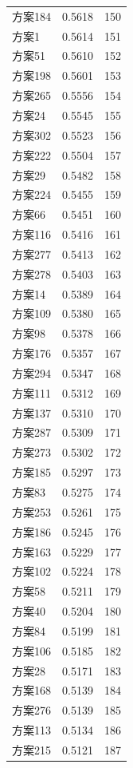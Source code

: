 \documentclass[12pt,a4paper]{article}
\begin{document}
\begin{table}[H]
\begin{tabular}{lcc}
    方案184 & 0.5618 & 150 \\
    方案1 & 0.5614 & 151 \\
    方案51 & 0.5610 & 152 \\
    方案198 & 0.5601 & 153 \\
    方案265 & 0.5556 & 154 \\
    方案24 & 0.5545 & 155 \\
    方案302 & 0.5523 & 156 \\
    方案222 & 0.5504 & 157 \\
    方案29 & 0.5482 & 158 \\
    方案224 & 0.5455 & 159 \\
    方案66 & 0.5451 & 160 \\
    方案116 & 0.5416 & 161 \\
    方案277 & 0.5413 & 162 \\
    方案278 & 0.5403 & 163 \\
    方案14 & 0.5389 & 164 \\
    方案109 & 0.5380 & 165 \\
    方案98 & 0.5378 & 166 \\
    方案176 & 0.5357 & 167 \\
    方案294 & 0.5347 & 168 \\
    方案111 & 0.5312 & 169 \\
    方案137 & 0.5310 & 170 \\
    方案287 & 0.5309 & 171 \\
    方案273 & 0.5302 & 172 \\
    方案185 & 0.5297 & 173 \\
    方案83 & 0.5275 & 174 \\
    方案253 & 0.5261 & 175 \\
    方案186 & 0.5245 & 176 \\
    方案163 & 0.5229 & 177 \\
    方案102 & 0.5224 & 178 \\
    方案58 & 0.5211 & 179 \\
    方案40 & 0.5204 & 180 \\
    方案84 & 0.5199 & 181 \\
    方案106 & 0.5185 & 182 \\
    方案28 & 0.5171 & 183 \\
    方案168 & 0.5139 & 184 \\
    方案276 & 0.5139 & 185 \\
    方案113 & 0.5134 & 186 \\
    方案215 & 0.5121 & 187 \\

\end{tabular}
\end{table}
\end{document}
